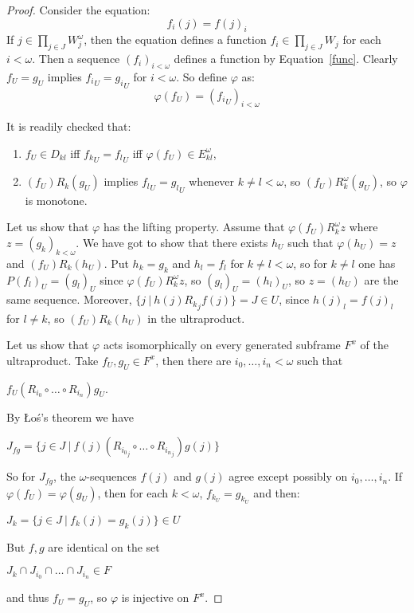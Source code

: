 \documentclass{article}
\theoremstyle{defin}
\theoremstyle{theorem}
\theoremstyle{claim}
\theoremstyle{prop}
\theoremstyle{lemma}
\theoremstyle{fact}
\theoremstyle{remark}
\theoremstyle{ex}
\theoremstyle{col}
\theoremstyle{question}
\let\strokeL\L
\renewcommand\L{\mathbf{L}}
\begin{document}
\begin{proof}
Consider the equation:
\begin{equation} \label{func}
f_i(j) = f{(j)}_i
\end{equation}
If $j \in \prod \limits_{j \in J} W^{\omega}_{j}$, 
then the equation defines a function $f_i \in \prod_{j \in J} W_j$ for each $i < \omega$. 
Then a sequence ${(f_i)}_{i < \omega}$ defines a function by Equation~\ref{func}. 
Clearly $f_U = g_U$ implies ${f_i}_U = {g_i}_U$ for $i < \omega$. So define $\varphi$ as:
\begin{equation}
\varphi(f_U) = {({f_i}_U)}_{i < \omega}
\end{equation}

It is readily checked that:
\begin{enumerate}
\item $f_U \in D_{k l}$ iff ${f_k}_U = {f_l}_U$ iff $\varphi(f_U) \in E^{\omega}_{k l}$,
\item $(f_U) R_k (g_U)$ implies ${f_l}_U = {g_l}_U$ 
whenever $k \neq l < \omega$, so $(f_U) R^{\omega}_k (g_U)$, so $\varphi$ is monotone.
\end{enumerate}
Let us show that $\varphi$ has the lifting property. Assume that $\varphi(f_U) R^{\omega}_k z$ 
where $z = {(g_k)}_{k < \omega}$. We have got to show that there exists $h_U$ such that 
$\varphi(h_U) = z$ and $(f_U) R_k (h_U)$. Put $h_k = g_k$ and $h_l = f_l$ for $k \neq l < \omega$, 
so for $k \neq l$ one has $P{(f_l)}_U = {(g_l)}_U$ since $\varphi(f_U) R^{\omega}_k z$, 
so ${(g_l)}_U = {(h_l)}_U$, so $z = (h_U)$ are the same sequence. 
Moreover, $\{ j \: | \: h(j) {R_k}_j f(j)\} = J \in U$, 
since ${h(j)}_l = {f(j)}_l$ for $l \neq k$, so $(f_U) R_k (h_U)$ in the ultraproduct.

\vspace{\baselineskip}

Let us show that $\varphi$ acts isomorphically on every generated subframe $F^{x}$ of the ultraproduct. Take $f_U, g_U \in F^{x}$, then there are $i_0, \dots, i_n < \omega$ such that
\begin{center}
$f_U(R_{i_0} \circ \dots \circ R_{i_n})g_U$.
\end{center}
By \strokeL o\'s's theorem we have
\begin{center}
$J_{fg} = \{ j \in J \: | \: f(j)(R_{{i_0}_j} \circ \dots \circ R_{{i_n}_j})g(j) \}$
\end{center}
So for $J_{fg}$, the $\omega$-sequences $f(j)$ and $g(j)$ agree except possibly on $i_0, \dots, i_n$. 
If $\varphi(f_U) = \varphi(g_U)$, then for each $k < \omega$, $f_{k_U} = g_{k_U}$ and then:
\begin{center}
$J_k = \{ j \in J \: | \: f_k(j) = g_k(j) \} \in U$
\end{center}
But $f, g$ are identical on the set
\begin{center}
$J_k \cap J_{i_0} \cap \dots \cap J_{i_n} \in F$
\end{center}
and thus $f_U = g_U$, so $\varphi$ is injective on $F^{x}$.
\end{proof}
\end{document}
